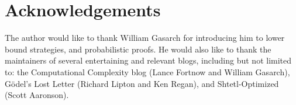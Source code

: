 \documentclass[12pt]{article}
\theoremstyle{definition}
\begin{document}
\section{Acknowledgements}

The author would like to thank William Gasarch for introducing him
to lower bound strategies, and probabilistic proofs.
He would also like to thank the maintainers of
several entertaining and relevant blogs, including but
not limited to: the Computational Complexity blog
(Lance Fortnow and William Gasarch), 
G\"odel's Lost Letter (Richard Lipton and Ken Regan),
and Shtetl-Optimized (Scott Aaronson). 



\end{document}
